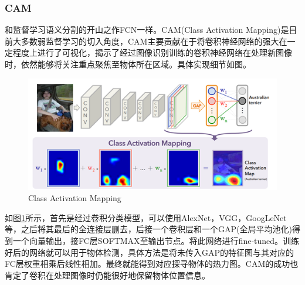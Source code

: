 \documentclass{article}
\begin{document}
\begin{CJK}{UTF8}{gbsn}
\subsubsection{CAM}
和监督学习语义分割的开山之作FCN\cite{long2015fully}一样。CAM(Class Activation Mapping)\cite{zhou2016learning}是目前大多数弱监督学习的切入角度，CAM\cite{zhou2016learning}主要贡献在于将卷积神经网络的强大在一定程度上进行了可视化，揭示了经过图像识别训练的卷积神经网络在处理新图像时，依然能够将关注重点聚焦至物体所在区域。具体实现细节如图\cite{CAM}。
\begin{figure}[h]
    \centering
    \includegraphics[scale=0.7]{imgs/2-6_Class_Activation_Mapping.png}
    \caption{Class Activation Mapping}
    \label{CAM}
\end{figure}

如图\ref{CAM}所示，首先是经过卷积分类模型，可以使用AlexNet\cite{krizhevsky2012imagenet}，VGG\cite{simonyan2014very}，GoogLeNet\cite{szegedy2015going}等，之后将其最后的全连接层删去，后接一个卷积层和一个GAP(全局平均池化)得到一个向量输出，接FC层SOFTMAX至输出节点。将此网络进行fine-tuned。训练好后的网络就可以用于物体检测，具体方法是将未传入GAP的特征图与其对应的FC层权重相乘后线性相加。最终就能得到对应探寻物体的热力图。CAM\cite{zhou2016learning}的成功也肯定了卷积在处理图像时仍能很好地保留物体位置信息。


\end{CJK}
\end{document}
